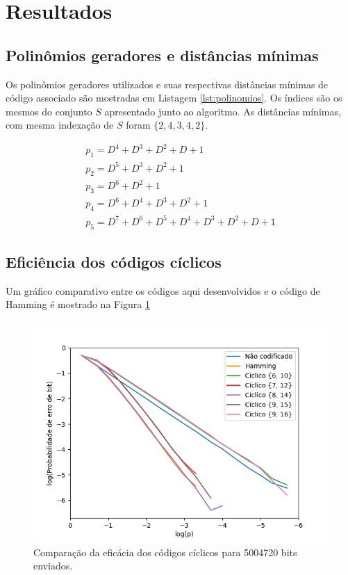 \section{Resultados}
\subsection{Polinômios geradores e distâncias mínimas}
Os polinômios geradores utilizados e suas respectivas distâncias mínimas de código associado são mostradas em Listagem \ref{lst:polinomios}. Os índices são os mesmos do conjunto $S$ apresentado junto ao algoritmo. As distâncias mínimas, com mesma indexação de $S$ foram $\{2, 4, 3, 4, 2\}$.

\begin{align}
	\nonumber
	p_1 = D^4+D^3+D^2+D+1\\ \nonumber
	p_2 = D^5+D^3+D^2+1\\ \nonumber
	p_3 = D^6+D^2+1\\ \nonumber
	p_4 = D^6+D^4+D^3+D^2+1\\
	p_5 = D^7+D^6+D^5+D^4+D^3+D^2+D+1
	\label{lst:polinomios}
\end{align}

\subsection{Eficiência dos códigos cíclicos}

Um gráfico comparativo entre os códigos aqui desenvolvidos e o código de Hamming é mostrado na Figura \ref{fig:cyclic_comparison}

\begin{figure}[!hb]
	\centering
	\captionsetup{justification=centering}
	\includegraphics[scale=0.6]{floats/cyclic_5x10e6.png}
	\caption{\label{fig:cyclic_comparison}Comparação da eficácia dos códigos cíclicos para 5004720 bits enviados.}
\end{figure}

